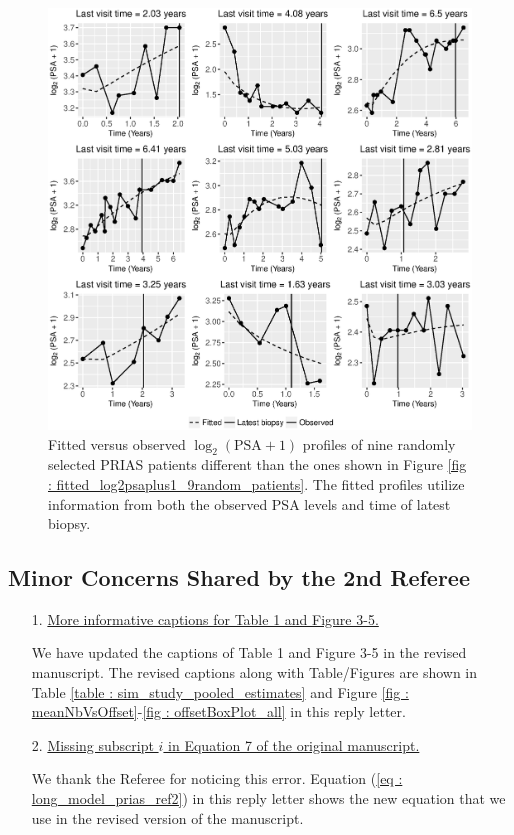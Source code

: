 \begin{enumerate}
         \clearpage
        \begin{figure}[!htb]
        \centerline{\includegraphics[width=\columnwidth]{../images/model_fit/fitted_log2psaplus1_10to18random_patients.eps}}
        \caption{Fitted versus observed $\log_2(\mbox{PSA}+1)$ profiles of nine randomly selected PRIAS patients different than the ones shown in Figure \ref{fig : fitted_log2psaplus1_9random_patients}. The fitted profiles utilize information from both the observed PSA levels and time
of latest biopsy.}
        \label{fig : fitted_log2psaplus1_10to18random_patients}
        \end{figure}
        
    \end{enumerate}

    \clearpage
    \subsection*{Minor Concerns Shared by the 2nd Referee}

    \begin{enumerate}
        \item[1.] \underline{More informative captions for Table 1 and Figure 3-5.}

        We have updated the captions of Table 1 and Figure 3-5 in the revised manuscript. The revised captions along with Table/Figures are shown in Table \ref{table : sim_study_pooled_estimates} and Figure \ref{fig : meanNbVsOffset}-\ref{fig : offsetBoxPlot_all} in this reply letter.

        \item[2.] \underline{Missing subscript $i$ in Equation 7 of the original manuscript.}

        We thank the Referee for noticing this error. Equation (\ref{eq : long_model_prias_ref2}) in this reply letter shows the new equation that we use in the revised version of the manuscript.

    \end{enumerate}


